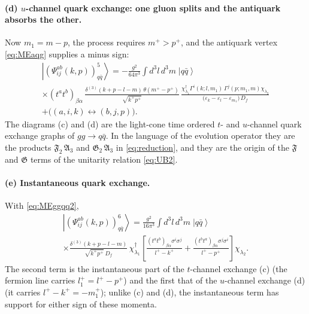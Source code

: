 \documentclass[11pt,a4paper]{article}
\numberwithin{equation}{section}
\newcommand{\ibarh}[2]{\draw[line width=1.1pt] (#1,#2-0.13) -- (#1,#2+0.13);}
\newcommand{\mf}[1]{\mathfrak{#1}}
\newcommand{\eps}{\varepsilon}
\newcommand{\dg}{\dagger}
\newcommand{\dthree}{\delta^{(3)}}
\newcommand{\ket}[1]{\left|#1\right\rangle}
\newcommand{\Gam}{\Gamma}
\newcommand{\qk}[3]{q^{#1}_{#2}(#3)}
\newcommand{\aqk}[3]{\bar q^{#1}_{#2}(#3)}
\newcommand{\gl}[3]{g^{#1}_{#2}(#3)}
\begin{document}
\paragraph{(d) $u$-channel quark exchange: one gluon splits and the antiquark absorbs the other.}
Now $m_{1}=m-p$, the process requires $m^{+}>p^{+}$, and the antiquark vertex \eqref{eq:MEaqg}
supplies a minus sign:
\begin{multline}
\ket{(\Psi^{ab}_{ij}(k,p))^{5}_{q\bar q}}=-\frac{g^{2}}{64\pi^{3}}\int\!d^{3}l\,d^{3}m\;\ket{q\bar q}\;\\
\times(t^{a}t^{b})_{\beta\alpha}\,
\frac{\dthree(k+p-l-m)\,\theta(m^{+}-p^{+})}{\sqrt{k^{+}p^{+}}}\,
\frac{\chi^{\dg}_{\lambda_{1}}\Gam^{i}(k;l,m_{1})\,\Gam^{j}(p;m_{1},m)\chi_{\lambda_{2}}}
{\big(\eps_{k}-\eps_{l}-\eps_{m_{1}}\big)\,D_{f}}\\
+\big((a,i,k)\leftrightarrow(b,j,p)\big).
\label{eq:B1d}
\end{multline}
The diagrams (c) and (d) are the light-cone time ordered $t$- and $u$-channel quark exchange
graphs of $gg\to q\bar q$. In the language of the evolution operator they are the products
$\mf F_{2}\,\mf A_{3}$ and $\mf G_{2}\,\mf A_{3}$ in \eqref{eq:reduction}, and they are the origin of
the $\mf F$ and $\mf G$ terms of the unitarity relation \eqref{eq:UB2}.

\paragraph{(e) Instantaneous quark exchange.}
\begin{center}
\end{center}
With \eqref{eq:MEggqq2},
\begin{multline}
\ket{(\Psi^{ab}_{ij}(k,p))^{6}_{q\bar q}}=\frac{g^{2}}{16\pi^{3}}\int\!d^{3}l\,d^{3}m\;\ket{q\bar q}\,
\\
\times\frac{\dthree(k+p-l-m)}{\sqrt{k^{+}p^{+}}\,D_{f}}\,
\chi^{\dg}_{\lambda_{1}}\!\left[\frac{(t^{a}t^{b})_{\beta\alpha}\sigma^{i}\sigma^{j}}{l^{+}-k^{+}}
+\frac{(t^{b}t^{a})_{\beta\alpha}\sigma^{j}\sigma^{i}}{l^{+}-p^{+}}\right]\chi_{\lambda_{2}} .
\label{eq:B1e}
\end{multline}
The second term is the instantaneous part of the $t$-channel exchange (c) (the fermion line
carries $l_{1}^{+}=l^{+}-p^{+}$) and the first that of the $u$-channel exchange (d) (it carries
$l^{+}-k^{+}=-m_{1}^{+}$); unlike (c) and (d), the instantaneous term has support for either sign
of these momenta.
\end{document}
